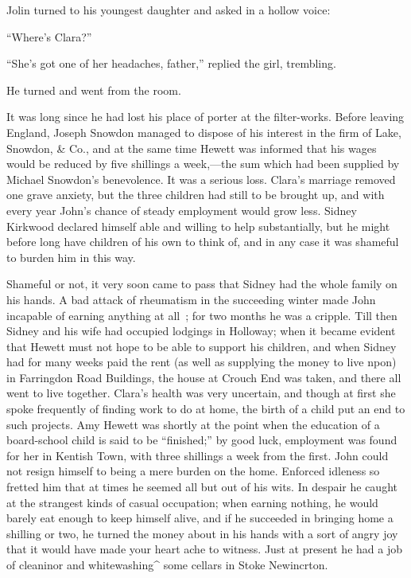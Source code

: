{\protect\hypertarget{257}{}{}} Jolin turned to his youngest daughter
and asked in a hollow voice:

``Where's Clara?''

``She's got one of her headaches, father,'' replied the girl, trembling.

He turned and went from the room.

It was long since he had lost his place of porter at the filter-works.
Before leaving England, Joseph Snowdon managed to dispose of his
interest in the firm of Lake, Snowdon, \& Co., and at the same time
Hewett was informed that his wages would be reduced by five shillings a
week,---the sum which had been supplied by Michael Snowdon's
benevolence. It was a serious loss. Clara's marriage removed one grave
anxiety, but the three children had still to be brought up, and with
every year John's chance of steady employment would grow less. Sidney
Kirkwood declared himself able and willing to help substantially, but he
might before long have children of his own to think of, and in any case
it was shameful to burden him in this way.

Shameful or not, it very soon came to pass that Sidney had the whole
family on his hands. {\protect\hypertarget{258}{}{}} A bad attack of
rheumatism in the succeeding winter made John incapable of earning
anything at all~; for two months he was a cripple. Till then Sidney and
his wife had occupied lodgings in Holloway; when it became evident that
Hewett must not hope to be able to support his children, and when Sidney
had for many weeks paid the rent (as well as supplying the money to live
npon) in Farringdon Road Buildings, the house at Crouch End was taken,
and there all went to live together. Clara's health was very uncertain,
and though at first she spoke frequently of finding work to do at home,
the birth of a child put an end to such projects. Amy Hewett was shortly
at the point when the education of a board-school child is said to be
``finished;'' by good luck, employment was found for her in Kentish
Town, with three shillings a week from the first. John could not resign
himself to being a mere burden on the home. Enforced idleness so fretted
him that at times he seemed all but out of his wits. In despair he
caught at the strangest kinds of casual occupation; when earning
nothing, he would barely eat enough to keep himself alive, and if he
succeeded in bringing {\protect\hypertarget{259}{}{}} home a shilling or
two, he turned the money about in his hands with a sort of angry joy
that it would have made your heart ache to witness. Just at present he
had a job of cleaninor and whitewashing\^{} some cellars in Stoke
Newincrton.

